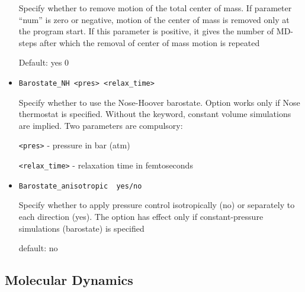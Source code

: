 \documentclass{article}
\begin{document}
\begin{itemize}
Specify whether to remove motion of the total center of mass.
If parameter ``num'' is zero or negative, motion of the center of
mass is removed only at the program start. If this parameter is positive, 
it gives the number of MD-steps after which the removal of center of mass
motion is repeated

Default:  yes 0 

\item
\verb|Barostate_NH <pres> <relax_time>|

Specify whether to use the Nose-Hoover barostate. Option works only if
Nose thermostat is specified. Without the keyword, constant volume
simulations are implied. Two parameters are compulsory:

\verb|<pres>| - pressure in bar (atm)

\verb|<relax_time>| - relaxation time in femtoseconds 

\item
\verb|Barostate_anisotropic  yes/no|

Specify whether to apply pressure control isotropically (no)
or separately to each direction (yes). The option has effect only
if constant-pressure simulations (barostate) is specified

default: no

\end{itemize}

\subsection{Molecular Dynamics}
\end{document}
